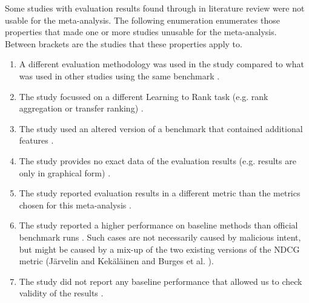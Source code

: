 Some studies with evaluation results found through in literature review were not usable for the meta-analysis. The following enumeration enumerates those properties that made one or more studies unusable for the meta-analysis. Between brackets are the studies that these properties apply to.

\begin{enumerate}
\item A different evaluation methodology was used in the study compared to what was used in other studies using the same benchmark \cite{Geng2011, Lin2012}.
\item The study focussed on a different Learning to Rank task (e.g. rank aggregation or transfer ranking) \cite{De2011, De2010, Derhami2013, De2012, Chen2010, Ah-Pine2008, Wang2009c, De2013, Miao2013, Hoi2008, De2012b, Duh2011b, Argentini2012, Qin2010c, Volkovs2013, Desarkar2011, Pan2013, Lin2011b, Volkovs2012, Dammak2011}.
\item The study used an altered version of a benchmark that contained additional features \cite{Bidoki2009, Ding2010}.
\item The study provides no exact data of the evaluation results (e.g. results are only in graphical form) \cite{Wang2008, Wang2010, Xu2010, Kuo2009, Li2008, Xia2008, Zhou2011, Wu2011, Zhu2009, Karimzadehgan2011, Swersky2012, Pan2011, Ni2008, Ciaramita2008, Stewart2012, Petterson2009, Agarwal2010, Chang2009, Qin2008c, Adams2011, Sculley2009, Huang2008, Alejo2010, Sun2011, He2010b, Benbouzid2012, Geng2012, Chen2012, Xu2012, Shivaswamy2011}.
\item The study reported evaluation results in a different metric than the metrics chosen for this meta-analysis \cite{Yu2009, Thuy2009, Pahikkala2009, Kersting2009, Mohan2011}.
\item The study reported a higher performance on baseline methods than official benchmark runs \cite{Dubey2009, Banerjee2009, Peng2010b, Song2014, Bian2010, Bian2010b, Carvalho2008, Acharyya2012, Peng2010b, Tran2012, Asadi2013c}. Such cases are not necessarily caused by malicious intent, but might be caused by a mix-up of the two existing versions of the \ac{NDCG} metric (J{\"a}rvelin and Kek{\"a}l{\"a}inen \cite{Jarvelin2002} and Burges et al. \cite{Burges2005}). 
\item The study did not report any baseline performance that allowed us to check validity of the results \cite{Chakrabarti2008, Wang2012b, Buffoni2011}.
\end{enumerate}

